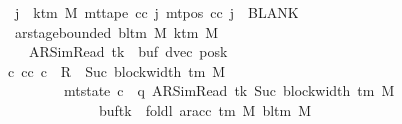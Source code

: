 \begin{isabellebody}
\ \ \ \ \ \ \ \ \ \ \ \ \ \ \ \ \ {\isasymforall}j\ {\isasymge}\ k{\isacharunderscore}{\kern0pt}tm\ M{\isachardot}{\kern0pt}\ mt{\isacharunderscore}{\kern0pt}tape\ cc\ j\ {\isacharparenleft}{\kern0pt}mt{\isacharunderscore}{\kern0pt}pos\ cc\ j{\isacharparenright}{\kern0pt}\ {\isacharequal}{\kern0pt}\ BLANK{}{\isacharsemicolon}{\kern0pt}\isanewline
\ \ \ \ \ \ \ \ \ \ \ \ \ \ \ \ \ ar{\isacharunderscore}{\kern0pt}stage{\isacharunderscore}{\kern0pt}bounded\ {\isacharparenleft}{\kern0pt}bl{\isacharunderscore}{\kern0pt}tm\ M{\isacharparenright}{\kern0pt}\ {\isacharparenleft}{\kern0pt}k{\isacharunderscore}{\kern0pt}tm\ M{\isacharparenright}{\kern0pt}\isanewline
\ \ \ \ \ \ \ \ \ \ \ \ \ \ \ \ \ \ \ {\isacharparenleft}{\kern0pt}AR{\isacharunderscore}{\kern0pt}SimRead{\isacharcomma}{\kern0pt}\ tk{\isacharcomma}{\kern0pt}\ {}{\isacharcomma}{\kern0pt}\ buf{\isacharcomma}{\kern0pt}\ dvec{\isacharcomma}{\kern0pt}\ posk{\isacharparenright}{\kern0pt}\ {\isasymrbrakk}\isanewline
\ \ \ \ \ \ \ \ \ \ \ \ \ \ \ {\isasymLongrightarrow}\ {\isasymexists}c{\isacharprime}{\kern0pt}{\isacharprime}{\kern0pt}{\isachardot}{\kern0pt}\ {\isacharparenleft}{\kern0pt}cc{\isacharcomma}{\kern0pt}\ c{\isacharprime}{\kern0pt}{\isacharprime}{\kern0pt}{\isacharparenright}{\kern0pt}\ {\isasymin}\ R{\isacharprime}{\kern0pt}\ {\isacharcircum}{\kern0pt}{\isacharcircum}{\kern0pt}\ Suc\ {\isacharparenleft}{\kern0pt}block{\isacharunderscore}{\kern0pt}width\ {\isacharparenleft}{\kern0pt}{\isasymGamma}{\isacharunderscore}{\kern0pt}tm\ M{\isacharparenright}{\kern0pt}{\isacharparenright}{\kern0pt}\isanewline
\ \ \ \ \ \ \ \ \ \ \ \ \ \ \ \ \ \ \ \ \ \ \ {\isasymand}\ mt{\isacharunderscore}{\kern0pt}state\ c{\isacharprime}{\kern0pt}{\isacharprime}{\kern0pt}\ {\isacharequal}{\kern0pt}\ {\isacharparenleft}{\kern0pt}q{\isacharcomma}{\kern0pt}\ AR{\isacharunderscore}{\kern0pt}SimRead{\isacharcomma}{\kern0pt}\ tk{\isacharcomma}{\kern0pt}\ Suc\ {\isacharparenleft}{\kern0pt}block{\isacharunderscore}{\kern0pt}width\ {\isacharparenleft}{\kern0pt}{\isasymGamma}{\isacharunderscore}{\kern0pt}tm\ M{\isacharparenright}{\kern0pt}{\isacharparenright}{\kern0pt}{\isacharcomma}{\kern0pt}\isanewline
\ \ \ \ \ \ \ \ \ \ \ \ \ \ \ \ \ \ \ \ \ \ \ \ \ \ \ \ \ buf{\isacharparenleft}{\kern0pt}tk\ {\isacharcolon}{\kern0pt}{\isacharequal}{\kern0pt}\ foldl\ {\isacharparenleft}{\kern0pt}ar{\isacharunderscore}{\kern0pt}acc\ {\isacharparenleft}{\kern0pt}{\isasymGamma}{\isacharunderscore}{\kern0pt}tm\ M{\isacharparenright}{\kern0pt}\ {\isacharparenleft}{\kern0pt}bl{\isacharunderscore}{\kern0pt}tm\ M{\isacharparenright}{\kern0pt}{\isacharparenright}{\kern0pt}\isanewline

\end{isabellebody}
